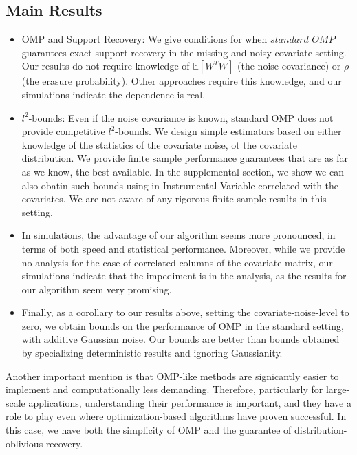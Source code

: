 \documentclass[a4paper,10pt]{article}
\theoremstyle{definition}
\begin{document}
\subsection{Main Results}
\begin{itemize}
	\item OMP and Support Recovery: We give conditions for when $standard$ $OMP$ guarantees exact support recovery in the missing and noisy covariate setting. Our results do not require knowledge of $\mathbb{E}[W^TW]$ (the noise covariance) or $\rho$ (the erasure probability). Other approaches require this knowledge, and our simulations indicate the dependence is real. 
	\item $l^2$-bounds: Even if the noise covariance is known, standard OMP does not provide competitive $l^2$-bounds. We design simple estimators based on either knowledge of the statistics of the covariate noise, ot the covariate distribution. We provide finite sample performance guarantees that are as far as we know, the best available. In the supplemental section, we show we can also obatin such bounds using in Instrumental Variable correlated with the covariates. We are not aware of any rigorous finite sample results in this setting.
	\item In simulations, the advantage of our algorithm seems more pronounced, in terms of both speed and statistical performance. Moreover, while we provide no analysis for the case of correlated columns of the covariate matrix, our simulations indicate that the impediment is in the analysis, as the results for our algorithm seem very promising.
	\item Finally, as a corollary to our results above, setting the covariate-noise-level to zero, we obtain bounds on the performance of OMP in the standard setting, with additive Gaussian noise. Our bounds are better than bounds obtained by specializing deterministic results and ignoring Gaussianity.
\end{itemize}

Another important mention is that OMP-like methods are signicantly easier to implement and computationally less
demanding. Therefore, particularly for large-scale
applications, understanding their performance is important,
and they have a role to play even where
optimization-based algorithms have proven successful.
In this case, we have both the simplicity of OMP and
the guarantee of distribution-oblivious recovery.



\newpage
\end{document}
